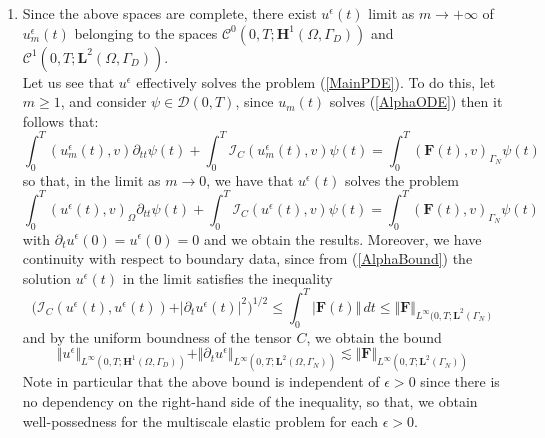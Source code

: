 \begin{enumerate}
    \item Since the above spaces are complete, there exist $u^{\epsilon}(t)$ limit as $m \longrightarrow +\infty$ of $u^{\epsilon}_m(t)$ belonging to the spaces $\mathcal{C}^0(0,T; \mathbf{H}^1(\Omega, \Gamma_D))$ and $\mathcal{C}^1(0,T; \mathbf{L}^2(\Omega, \Gamma_D))$.\\
    Let us see that $u^{\epsilon}$ effectively solves the problem (\ref{MainPDE}). To do this, let $m \geq 1$, and consider $\psi \in \mathcal{D}(0,T)$, since $u_m(t)$ solves (\ref{AlphaODE}) then it follows that:
    \begin{equation*}
        \int_0^T (u_m^{\epsilon}(t),v) \partial_{tt}\psi(t) + \int_0^T \mathcal{I}_C (u_m^{\epsilon}(t),v) \psi(t)  = \int_0^T (\mathbf{F}(t),v)_{\Gamma_N} \psi(t) 
    \end{equation*}
    so that, in the limit as $m \longrightarrow 0$, we have that $u^{\epsilon}(t)$ solves the problem
    \begin{equation*}
        \int_0^T (u^{\epsilon}(t),v)_{\Omega} \partial_{tt}\psi(t) + \int_0^T \mathcal{I}_C (u^{\epsilon}(t),v) \psi(t) = \int_0^T (\mathbf{F}(t),v)_{\Gamma_N}\psi(t) 
    \end{equation*}
    with $\partial_t u^{\epsilon}(0) = u^{\epsilon}(0) = 0$ and we obtain the results. Moreover, we have continuity with respect to boundary data, since from (\ref{AlphaBound}) the solution $u^{\epsilon}(t)$ in the limit satisfies the inequality 
    \begin{equation*}
        \big( \mathcal{I}_C(u^{\epsilon}(t), u^{\epsilon}(t))+ \vert \partial_t u^{\epsilon}(t) \vert^2 \big)^{1/2} \leq \int_0^T \vert \mathbf{F}(t) \Vert \, dt \leq \Vert \mathbf{F}\Vert_{L^{\infty}(0,T;\mathbf{L}^2(\Gamma_N)}
    \end{equation*}
    and by the uniform boundness of the tensor $C$, we obtain the bound
    \begin{equation*}
        \Vert u^{\epsilon} \Vert_{L^{\infty}(0,T;\mathbf{H}^1(\Omega, \Gamma_D))}  + \Vert \partial_t u^{\epsilon} \Vert_{L^{\infty}(0,T;\mathbf{L}^2(\Omega, \Gamma_N))} \lesssim \Vert \mathbf{F}\Vert_{L^{\infty}(0,T; \mathbf{L}^2(\Gamma_N))}
    \end{equation*}
    Note in particular that the above bound is independent of $\epsilon > 0$ since there is no dependency on the right-hand side of the inequality, so that, we obtain well-possedness for the multiscale elastic problem for each $\epsilon > 0$.
\end{enumerate}

